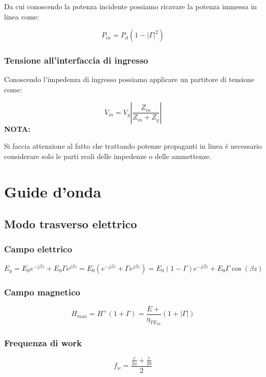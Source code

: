 \documentclass[10pt,a4paper]{report}
\begin{document}
		Da cui conoscendo la potenza incidente possiamo ricavare la potenza immessa in linea come:

		\[
		P_{in}=P_d(1-|\Gamma|^2)
		\]

		\subsection{Tensione all'interfaccia di ingresso}

		Conoscendo l'impedenza di ingresso possiamo applicare un partitore di tensione come:

		\[
		V_{in}=V_g|\frac{Z_{in}}{Z_{in}+Z_g}|
		\]
		\textbf{NOTA:}

		Si faccia attenzione al fatto che trattando potenze propaganti in linea è necessario considerare solo le parti reali delle impedenze o delle ammettenze.

\chapter{Guide d'onda}
		
	\section{Modo trasverso elettrico}

		\subsection{Campo elettrico}
				\begin{equation}
				E_y= E_0e^{-j\beta z}+E_0 \Gamma e^{j \beta z}=E_0(e^{-j \beta z}+\Gamma e^{j \beta z}) =E_0(1 - \Gamma)e^{-j \beta z} + E_0 \Gamma \cos(\beta z)
				\end{equation}

		\subsection{Campo magnetico}

				\begin{equation}
				H_{max}=H^+(1+\Gamma)=\frac{E+}{\eta_{TE_{10}}}{(1+|\Gamma|)}
				\end{equation}

		\subsection{Frequenza di work}

				\begin{equation}
				f_w=\frac{\frac{c}{2a}+\frac{c}{2b}}{2}
				\end{equation}
\end{document}
